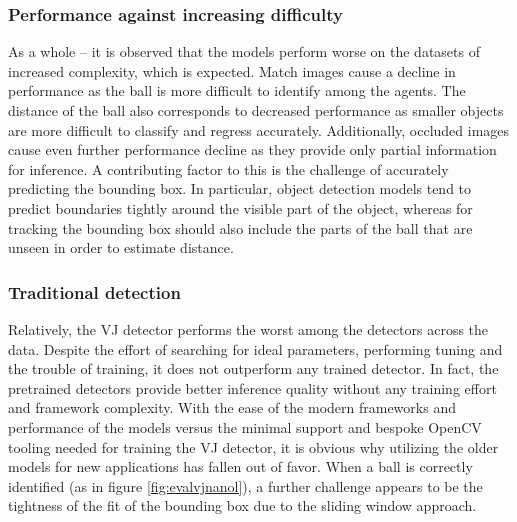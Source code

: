 \documentclass[a4paper,twoside,12pt]{report}
\begin{document}
\subsubsection{Performance against increasing difficulty}

As a whole -- it is observed that the models perform worse on the datasets of increased complexity, which is expected. Match images cause a decline in performance as the ball is more difficult to identify among the agents. The distance of the ball also corresponds to decreased performance as smaller objects are more difficult to classify and regress accurately. Additionally, occluded images cause even further performance decline as they provide only partial information for inference. A contributing factor to this is the challenge of accurately predicting the bounding box. In particular, object detection models tend to predict boundaries tightly around the visible part of the object, whereas for tracking the bounding box should also include the parts of the ball that are unseen in order to estimate distance. 

\subsubsection{Traditional detection}

Relatively, the VJ detector performs the worst among the detectors across the data. Despite the effort of searching for ideal parameters, performing tuning and the trouble of training, it does not outperform any trained detector. In fact, the pretrained detectors provide better inference quality without any training effort and framework complexity. With the ease of the modern frameworks and performance of the models versus the minimal support and bespoke OpenCV tooling needed for training the VJ detector, it is obvious why utilizing the older models for new applications has fallen out of favor. When a ball is correctly identified (as in figure \ref{fig:evalvjnanol}), a further challenge appears to be the tightness of the fit of the bounding box due to the sliding window approach.
\end{document}
